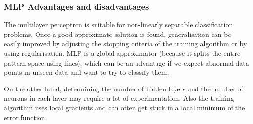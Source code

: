 \documentclass[a4paper, 11pt]{article}
\begin{document}
\subsubsection{MLP Advantages and disadvantages}
The multilayer perceptron is suitable for non-linearly separable classification problems. Once a good approximate solution is found, generalisation can be easily improved by adjusting the stopping criteria of the training algorithm or by using regularisation. MLP is a global approximator (because it splits the entire pattern space using lines), which can be an advantage if we expect abnormal data points in unseen data and want to try to classify them. 

On the other hand, determining the number of hidden layers and the number of neurons in each layer may require a lot of experimentation. Also the training algorithm uses local gradients and can often get stuck in a local minimum of the error function. 


\end{document}
